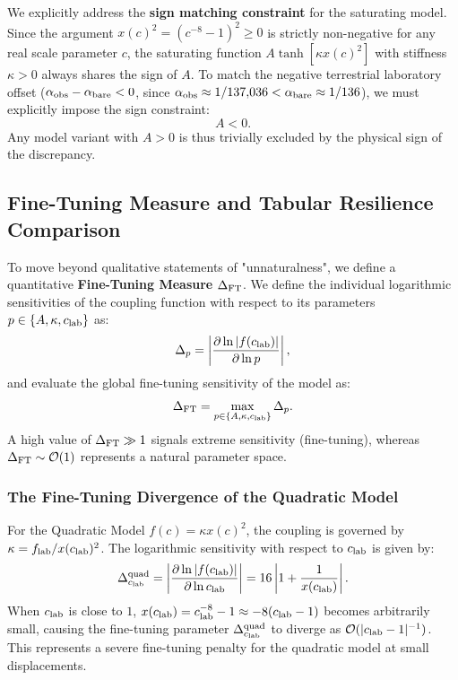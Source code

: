 \documentclass[11pt,a4paper]{article}
\theoremstyle{definition}
\begin{document}
\begin{enumerate}
		We explicitly address the \textbf{sign matching constraint} for the saturating model. Since the argument $x(c)^2 = (c^{-8}-1)^2 \ge 0$ is strictly non-negative for any real scale parameter $c$, the saturating function $A \tanh[\kappa x(c)^2]$ with stiffness $\kappa > 0$ always shares the sign of $A$. To match the negative terrestrial laboratory offset ($\alpha_{\rm obs} - \alpha_{\rm bare} < 0$, since $\alpha_{\rm obs} \approx 1/137{,}036 < \alpha_{\rm bare} \approx 1/136$), we must explicitly impose the sign constraint:
		\begin{equation}
			A < 0.
		\end{equation}
		Any model variant with $A > 0$ is thus trivially excluded by the physical sign of the discrepancy.
	\end{enumerate}
	
	\subsection{Fine-Tuning Measure and Tabular Resilience Comparison}
	To move beyond qualitative statements of "unnaturalness", we define a quantitative \textbf{Fine-Tuning Measure} $\Delta_{\rm FT}$. We define the individual logarithmic sensitivities of the coupling function with respect to its parameters $p \in \{A, \kappa, c_{\rm lab}\}$ as:
	\begin{equation}
		\Delta_p = \left| \frac{\partial\ln |f(c_{\rm lab})|}{\partial\ln p} \right|,
	\end{equation}
	and evaluate the global fine-tuning sensitivity of the model as:
	\begin{equation}
		\Delta_{\rm FT} = \max_{p \in \{A, \kappa, c_{\rm lab}\}} \Delta_p.
	\end{equation}
	A high value of $\Delta_{\rm FT} \gg 1$ signals extreme sensitivity (fine-tuning), whereas $\Delta_{\rm FT} \sim \mathcal{O}(1)$ represents a natural parameter space.
	
	\subsubsection{The Fine-Tuning Divergence of the Quadratic Model}
	For the Quadratic Model $f(c) = \kappa x(c)^2$, the coupling is governed by $\kappa = f_{\rm lab} / x(c_{\rm lab})^2$. The logarithmic sensitivity with respect to $c_{\rm lab}$ is given by:
	\begin{equation}
		\Delta_{c_{\rm lab}}^{\rm quad} = \left| \frac{\partial \ln |f(c_{\rm lab})|}{\partial \ln c_{\rm lab}} \right| = 16 \left| 1 + \frac{1}{x(c_{\rm lab})} \right|.
	\end{equation}
	When $c_{\rm lab}$ is close to $1$, $x(c_{\rm lab}) = c_{\rm lab}^{-8}-1 \approx -8(c_{\rm lab}-1)$ becomes arbitrarily small, causing the fine-tuning parameter $\Delta_{c_{\rm lab}}^{\rm quad}$ to diverge as $\mathcal{O}(|c_{\rm lab}-1|^{-1})$. This represents a severe fine-tuning penalty for the quadratic model at small displacements.
	
\end{document}
